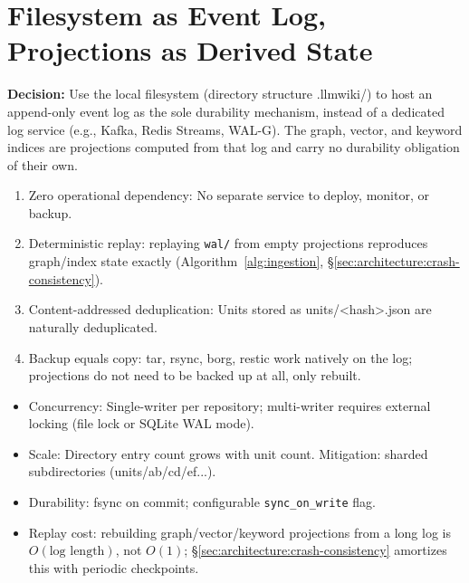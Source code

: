\section{Filesystem as Event Log, Projections as Derived State}
\label{sec:architecture:filesystem-wal}

\begin{designdecision}
\label{dec:fs-as-wal}
\textbf{Decision:} Use the local filesystem (directory structure .llmwiki/) to host an append-only event log as the sole durability mechanism, instead of a dedicated log service (e.g., Kafka, Redis Streams, WAL-G). The graph, vector, and keyword indices are projections computed from that log and carry no durability obligation of their own.
\end{designdecision}

\begin{designrationale}
\begin{enumerate}
  \item Zero operational dependency: No separate service to deploy, monitor, or backup.
  \item Deterministic replay: replaying \texttt{wal/} from empty projections reproduces graph/index state exactly (Algorithm~\ref{alg:ingestion}, \S\ref{sec:architecture:crash-consistency}).
  \item Content-addressed deduplication: Units stored as units/<hash>.json are naturally deduplicated.
  \item Backup equals copy: tar, rsync, borg, restic work natively on the log; projections do not need to be backed up at all, only rebuilt.
\end{enumerate}
\end{designrationale}

\begin{designtradeoff}
\begin{itemize}
  \item Concurrency: Single-writer per repository; multi-writer requires external locking (file lock or SQLite WAL mode).
  \item Scale: Directory entry count grows with unit count. Mitigation: sharded subdirectories (units/ab/cd/ef...).
  \item Durability: fsync on commit; configurable \texttt{sync\_on\_write} flag.
  \item Replay cost: rebuilding graph/vector/keyword projections from a long log is $O(\text{log length})$, not $O(1)$; \S\ref{sec:architecture:crash-consistency} amortizes this with periodic checkpoints.
\end{itemize}
\end{designtradeoff}

